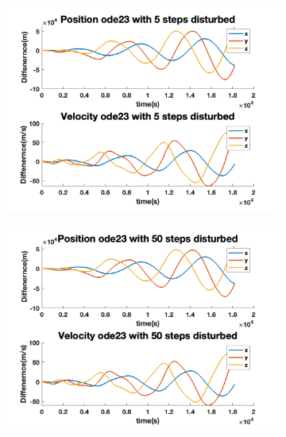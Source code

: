 \documentclass[12pt
,headinclude
,headsepline
,bibtotocnumbered
]{scrartcl}
\begin{document}
    \begin{figure}[H]
        \centering
        \begin{subfigure}[b]{0.45\textwidth}
        \includegraphics[width=1\textwidth]{./plots/ode23_5_yprime_d.png}
        \end{subfigure}
        \begin{subfigure}[b]{0.45\textwidth}
        \includegraphics[width=1\textwidth]{./plots/ode23_50_yprime_d.png}
        \end{subfigure}
        \begin{subfigure}[b]{0.45\textwidth}

\end{subfigure}
\end{figure}
\end{document}
